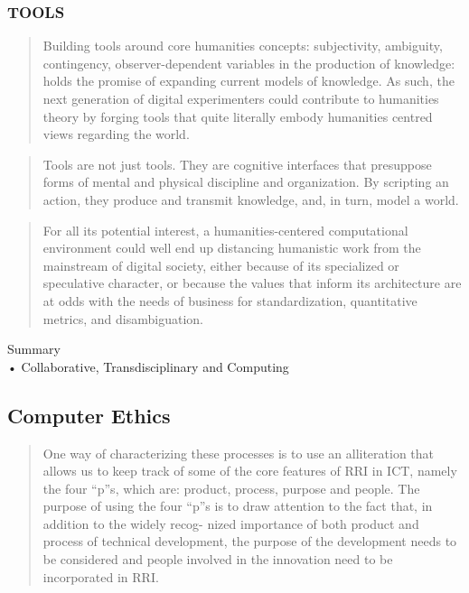 \subsubsection*{TOOLS}
\begin{quote}
  Building tools around core humanities concepts: subjectivity, ambiguity, contingency, observer-dependent variables in the production of knowledge: holds the promise of expanding current models of knowledge. As such, the next generation of digital experimenters could contribute to humanities theory by forging tools that quite literally embody humanities centred views regarding the world. \autocite[p.104]{Burdick2012}
\end{quote}

\begin{quote}
  Tools are not just tools. They are cognitive interfaces that presuppose forms of mental and physical discipline and organization. By scripting an action, they produce and transmit knowledge, and, in turn, model a world. \autocite[p.105]{Burdick2012}
\end{quote}

\begin{quote}
  For all its potential interest, a humanities-centered computational environment could well end up distancing humanistic work from the mainstream of digital society, either because of its specialized or speculative character, or because the values that inform its architecture are at odds with the needs of business for standardization, quantitative metrics, and disambiguation. \autocite[p.105]{Burdick2012}
\end{quote}

\begin{shaded}
Summary\\
•	Collaborative, Transdisciplinary and Computing
\end{shaded}

\subsection*{Computer Ethics}


\begin{quote}
  One way of characterizing these processes is to use an alliteration that allows us to keep track of some of the core features of RRI in ICT, namely the four “p”s, which are: product, process, purpose and people. The purpose of using the four “p”s is to draw attention to the fact that, in addition to the widely recog- nized importance of both product and process of technical development, the purpose of the development needs to be considered and people involved in the innovation need to be incorporated in RRI. \autocite{Stahl2013}
\end{quote}

